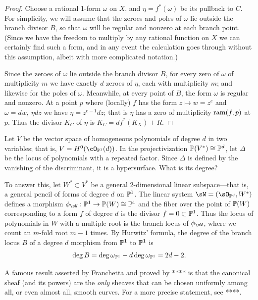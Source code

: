  
\begin{proof}
Choose a rational 1-form $\omega$ on $X$, and $\eta = f^*(\omega)$ be its pullback to $C$. For simplicity, we will assume that the zeroes and poles of $\omega$ lie outside the branch divisor $B$, so that $\omega$ will be regular and nonzero at each branch point. (Since we have the freedom to multiply by any rational function on $X$ we can certainly find such a form, and in any event the calculation goes through without this assumption, albeit with more complicated notation.) 

Since the zeroes of $\omega$ lie outside the branch divisor $B$, for every zero of $\omega$ of multiplicity $m$ we have exactly $d$ zeroes of $\eta$, each with multiplicity $m$; and likewise for the poles of $\omega$. Meanwhile, at every point of $B$, the form $\omega$ is regular and nonzero. At a point $p$ where (locally) $f$ has the form $z \mapsto w = z^{e}$
and $\omega = dw,\ \eta dz$ we have $\eta = z^{e-1}dz$; that is $\eta$ has a zero of multiplicity $\ram(f,p)$ at  $p$.
Thus the divisor $K_{C}$ of $\eta$ is
$K_{C} = df^{*}(K_{X})+R$.
\end{proof}

\begin{example}
 Let $V$ be the vector space of homogeneous polynomials of degree $d$ in two variables; that is, $V = H^0(\cO_{\PP^1}(d))$. In the projectivization $\PP(V^{*}) \cong \PP^d$, let $\Delta$ be the locus of polynomials with a repeated factor. Since $\Delta$ is defined by the vanishing of the discriminant, it is a hypersurface. What is its degree?
 
 To answer this, let $W^{*}\subset V^{*}$ be a general 2-dimensional linear subspace---that is, a general pencil of forms of degree $d$ on $\PP^1$. The linear system $\sW = (\sO_{\PP^{d}}, W^{*})$ defines a morphism $\phi_{\sW} : \PP^{1} \to \PP(W) \cong \PP^{1}$ and the fiber over the point of $\PP(W)$ corresponding to a form $f$ of degree $d$ is the divisor $f = 0\subset \PP^{1}$. Thus the locus of polynomials in $W$ with a multiple root is the branch locus of $\phi_{\sW}$, where we count an $m$-fold root $m-1$ times.
 By Hurwitz' formula, the degree of the branch locus $B$ of a degree $d$ morphism from $\PP^{1}$ to $\PP^{1}$ is
 $$
 \deg B = \deg \omega_{\PP^{1}} - d\deg \omega_{\PP^{1}} = 2d-2.
 $$
 \end{example}
 
\begin{fact}
A famous result asserted by Franchetta and proved by **** is that the canonical sheaf (and its powers) are the \emph{only} sheaves that can be chosen uniformly among all, or even almost all, smooth curves. For a more precise statement, see ****.
\end{fact}

